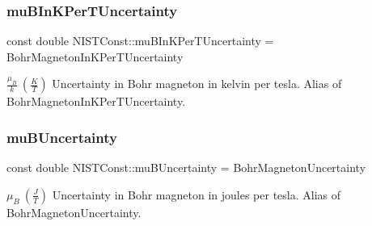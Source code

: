 \subsubsection{\texorpdfstring{mu\+B\+In\+K\+Per\+T\+Uncertainty}{muBInKPerTUncertainty}}
{\footnotesize\ttfamily const double N\+I\+S\+T\+Const\+::mu\+B\+In\+K\+Per\+T\+Uncertainty = Bohr\+Magneton\+In\+K\+Per\+T\+Uncertainty}

$\frac{\mu_B}{k} \ (\frac{K}{T})$ Uncertainty in Bohr magneton in kelvin per tesla. Alias of Bohr\+Magneton\+In\+K\+Per\+T\+Uncertainty. \mbox{\label{group___n_i_s_t_const-_bohr_magneton_ga6f7d483b5984d92f63b7fbe199fa3985}} 
\subsubsection{\texorpdfstring{mu\+B\+Uncertainty}{muBUncertainty}}
{\footnotesize\ttfamily const double N\+I\+S\+T\+Const\+::mu\+B\+Uncertainty = Bohr\+Magneton\+Uncertainty}

$\mu_B \ (\frac{J}{T})$ Uncertainty in Bohr magneton in joules per tesla. Alias of Bohr\+Magneton\+Uncertainty. 